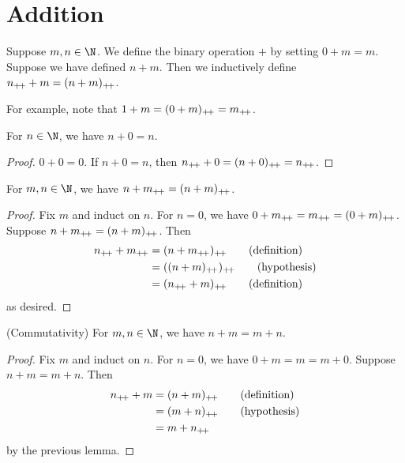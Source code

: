 \section{Addition} \label{sec:N:addition}

\begin{definition*}[Addition] \label{def:N:addition}
    Suppose $m, n \in \N$.
    We define the binary operation $+$ by setting $0 + m = m$.
    Suppose we have defined $n + m$.
    Then we inductively define $n_{+\!+} + m = (n + m)_{+\!+}$.
\end{definition*}
For example, note that $1 + m = (0 + m)_{+\!+} = m_{+\!+}$.

\begin{lemma} \label{thm:N:add_zero}
    For $n \in \N$, we have $n + 0 = n$.
\end{lemma}
\begin{proof}
    $0 + 0 = 0$.
    If $n + 0 = n$, then $n_{+\!+} + 0 = (n + 0)_{+\!+} = n_{+\!+}$.
\end{proof}

\begin{lemma} \label{thm:N:add_successor}
    For $m, n \in \N$, we have $n + m_{+\!+} = (n + m)_{+\!+}$.
\end{lemma}
\begin{proof}
    Fix $m$ and induct on $n$.
    For $n = 0$, we have $0 + m_{+\!+} = m_{+\!+} = (0 + m)_{+\!+}$.
    Suppose $n + m_{+\!+} = (n + m)_{+\!+}$.
    Then \begin{align*}
        n\pp + m\pp &= (n + m\pp)\pp \tag{definition} \\
                    &= ((n + m)\pp)\pp \tag{hypothesis} \\
                    &= (n\pp + m)\pp \tag{definition}
    \end{align*}
    as desired.
\end{proof}

\begin{exercise} \label{prb:N:add_commute}
    (Commutativity) For $m, n \in \N$, we have $n + m = m + n$.
\end{exercise}
\begin{proof}
    Fix $m$ and induct on $n$.
    For $n = 0$, we have $0 + m = m = m + 0$.
    Suppose $n + m = m + n$.
    Then \begin{align*}
        n_{+\!+} + m &= (n + m)_{+\!+} \tag{definition} \\
                 &= (m + n)_{+\!+} \tag{hypothesis} \\
                 &= m + n_{+\!+}
    \end{align*}
    by the previous lemma.
\end{proof}

